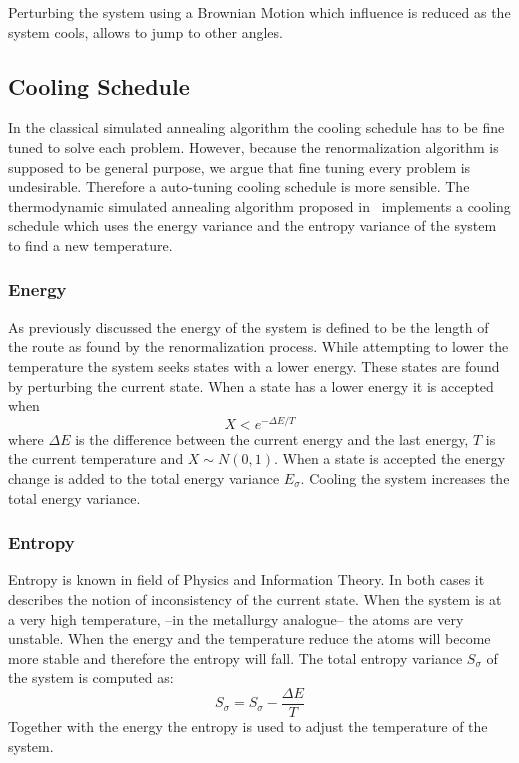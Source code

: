 Perturbing the system using a Brownian Motion which influence is reduced as
the system cools, allows to jump to other angles.

\subsection{Cooling Schedule}
In the classical simulated annealing algorithm the cooling schedule has to be
fine tuned to solve each problem. However, because the renormalization
algorithm is supposed to be general purpose, we argue that fine tuning every
problem is undesirable. Therefore a auto-tuning cooling schedule is more
sensible. The thermodynamic simulated annealing algorithm proposed in
\cite{devicente2003pts}~implements a cooling schedule which uses the energy
variance and the entropy variance of the system to find a new temperature. 

\subsubsection{Energy}
As previously discussed the energy of the system is defined to be the length
of the route as found by the renormalization process. While attempting to
lower the temperature the system seeks states with a lower energy. These
states are found by perturbing the current state. When a state has a lower
energy it is accepted when
\begin{equation}\label{eq:accept}
X < e^{-\Delta E / T}
\end{equation}
where $\Delta E$ is the difference between the current energy and the last
energy, $T$ is the current temperature and $X\sim N(0, 1)$. When a state is
accepted the energy change is added to the total energy variance $E_\sigma$.
Cooling the system increases the total energy variance.

\subsubsection{Entropy}
Entropy is known in field of Physics and Information Theory. In both cases it
describes the notion of inconsistency of the current state. When the system is
at a very high temperature, --in the metallurgy analogue-- the atoms are very
unstable. When the energy and the temperature reduce the atoms will become
more stable and therefore the entropy will fall. The total entropy variance
$S_\sigma$ of the system is computed as:
\begin{equation}\label{eq:entropy}
S_\sigma = S_\sigma - \frac{\Delta E}{T}
\end{equation}
Together with the energy the entropy is used to adjust the temperature of the
system.

